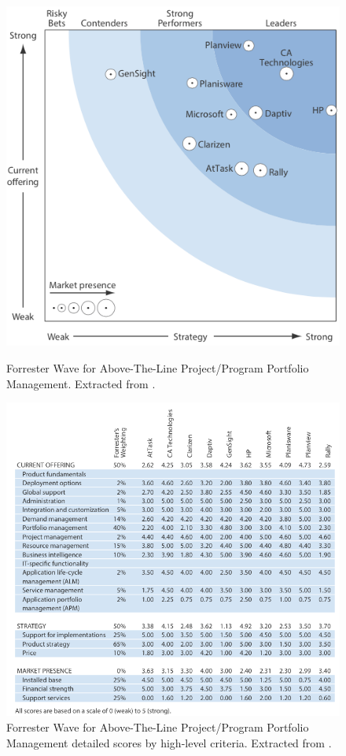 \begin{figure}[h!]
\begin{minipage}[h!]{0.40\linewidth}
\centering
\includegraphics[width=\textwidth]{img/AboveLineWave.png}
\caption{Forrester Wave for Above-The-Line Project/Program Portfolio Management. Extracted from \cite{forresterWavePPM}.}
\label{fig:figure1}
\end{minipage}
\hspace{0.5cm}
\begin{minipage}[h!]{0.60\linewidth}
\centering
\includegraphics[width=\textwidth]{img/AboveLineScores.png}
\caption{Forrester Wave for Above-The-Line Project/Program Portfolio Management detailed scores by high-level criteria. Extracted from \cite{forresterWavePPM}.}
\label{fig:figure2}
\end{minipage}
\end{figure}



